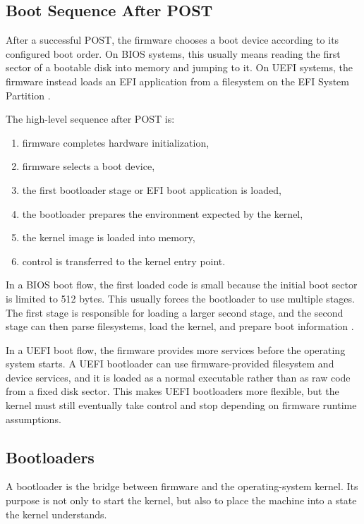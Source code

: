 \subsection{Boot Sequence After POST}
After a successful POST, the firmware chooses a boot device according to its configured boot order. On BIOS systems, this usually means reading the first sector of a bootable disk into memory and jumping to it. On UEFI systems, the firmware instead loads an EFI application from a filesystem on the EFI System Partition \cite{osdevBootSequence,uefiSpecifications}.

The high-level sequence after POST is:
\begin{enumerate}
  \item firmware completes hardware initialization,
  \item firmware selects a boot device,
  \item the first bootloader stage or EFI boot application is loaded,
  \item the bootloader prepares the environment expected by the kernel,
  \item the kernel image is loaded into memory,
  \item control is transferred to the kernel entry point.
\end{enumerate}

In a BIOS boot flow, the first loaded code is small because the initial boot sector is limited to 512 bytes. This usually forces the bootloader to use multiple stages. The first stage is responsible for loading a larger second stage, and the second stage can then parse filesystems, load the kernel, and prepare boot information \cite{osdevBootSequence}.

In a UEFI boot flow, the firmware provides more services before the operating system starts. A UEFI bootloader can use firmware-provided filesystem and device services, and it is loaded as a normal executable rather than as raw code from a fixed disk sector. This makes UEFI bootloaders more flexible, but the kernel must still eventually take control and stop depending on firmware runtime assumptions.

\subsection{Bootloaders}
A bootloader is the bridge between firmware and the operating-system kernel. Its purpose is not only to start the kernel, but also to place the machine into a state the kernel understands.

